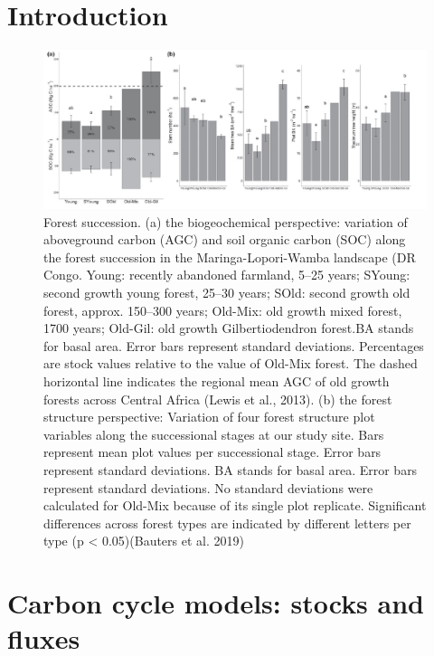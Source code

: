 \documentclass[12pt,oneside]{book}
\begin{document}

\section{Introduction}\label{introduction-1}

\begin{figure}

{\centering \includegraphics[width=0.8\linewidth]{figures/chap5/f51_bauters} 

}

\caption{Forest succession. (a) the biogeochemical perspective: variation of aboveground carbon (AGC) and soil organic carbon (SOC) along the forest succession in the Maringa-Lopori-Wamba landscape (DR Congo. Young: recently abandoned farmland, 5–25 years; SYoung: second growth young forest, 25–30 years; SOld: second growth old forest, approx. 150–300 years; Old-Mix: old growth mixed forest, 1700 years; Old-Gil: old growth Gilbertiodendron forest.BA stands for basal area. Error bars represent standard deviations. Percentages are stock values relative to the value of Old-Mix forest. The dashed horizontal line indicates the regional mean AGC of old growth forests across Central Africa (Lewis et al., 2013). (b) the forest structure perspective: Variation of four forest structure plot variables along the successional stages at our study site. Bars represent mean plot values per successional stage. Error bars represent standard deviations. BA stands for basal area. Error bars represent standard deviations. No standard deviations were calculated for Old-Mix because of its single plot replicate. Significant differences across forest types are indicated by different letters per type (p < 0.05)(Bauters et al. 2019)}\label{fig:f51}
\end{figure}

\section{Carbon cycle models: stocks and
fluxes}\label{carbon-cycle-models-stocks-and-fluxes}
\end{document}
